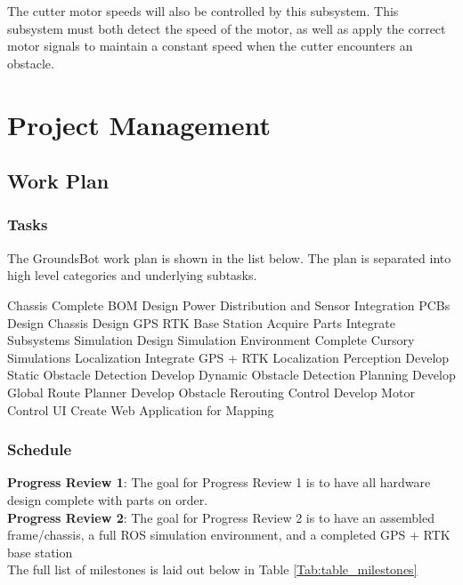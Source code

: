 \documentclass[12pt]{extarticle}
\begin{document}
			The cutter motor speeds will also be controlled by this subsystem. This subsystem must both detect the speed of the motor, as well as apply the correct motor signals to maintain a constant speed when the cutter encounters an obstacle. 


\newpage
\section{Project Management}
\subsection{Work Plan}
\subsubsection{Tasks}
The GroundsBot work plan is shown in the list below.  The plan is separated into high level categories and underlying subtasks. \\
\begin{outline}[enumerate]
  \1 Chassis
    \2 Complete BOM
    \2 Design Power Distribution and Sensor Integration PCBs %
    \2 Design Chassis
    \2 Design GPS RTK Base Station
    \2 Acquire Parts
    \2 Integrate Subsystems
  \1 Simulation
    \2 Design Simulation Environment
    \2 Complete Cursory Simulations
  \1 Localization
    \2 Integrate GPS + RTK Localization
  \1 Perception
    \2 Develop Static Obstacle Detection
    \2 Develop Dynamic Obstacle Detection
  \1 Planning
    \2 Develop Global Route Planner
    \2 Develop Obstacle Rerouting
  \1 Control
    \2 Develop Motor Control
  \1 UI
    \2 Create Web Application for Mapping
\end{outline}

   
\subsubsection{Schedule}
\noindent
\textbf{Progress Review 1}: The goal for Progress Review 1 is to have all hardware design complete with parts on order. \\
\textbf{Progress Review 2}: The goal for Progress Review 2 is to have an assembled frame/chassis, a full ROS simulation environment, and a completed GPS + RTK base station\\

The full list of milestones is laid out below in Table \ref{Tab:table_milestones}\\ 
\end{document}
